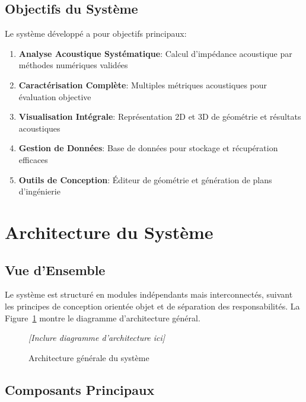 \documentclass[12pt,a4paper,twocolumn]{article}
\begin{document}
\subsection{Objectifs du Système}

Le système développé a pour objectifs principaux:

\begin{enumerate}
    \item \textbf{Analyse Acoustique Systématique}: Calcul d'impédance acoustique par méthodes numériques validées
    \item \textbf{Caractérisation Complète}: Multiples métriques acoustiques pour évaluation objective
    \item \textbf{Visualisation Intégrale}: Représentation 2D et 3D de géométrie et résultats acoustiques
    \item \textbf{Gestion de Données}: Base de données pour stockage et récupération efficaces
    \item \textbf{Outils de Conception}: Éditeur de géométrie et génération de plans d'ingénierie
\end{enumerate}

\section{Architecture du Système}

\subsection{Vue d'Ensemble}

Le système est structuré en modules indépendants mais interconnectés, suivant les principes de conception orientée objet et de séparation des responsabilités. La Figure~\ref{fig:arquitectura} montre le diagramme d'architecture général.

\begin{figure}[H]
\centering
\caption{Architecture générale du système}
\label{fig:arquitectura}
\textit{[Inclure diagramme d'architecture ici]}
\end{figure}

\subsection{Composants Principaux}
\end{document}
